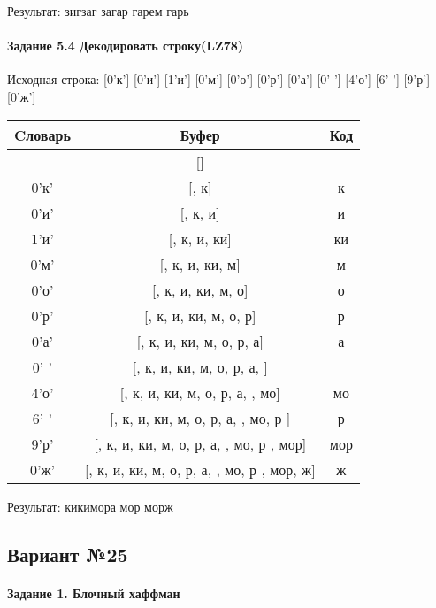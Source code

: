 \documentclass[a4paper, 12pt]{article}
\begin{document}
Результат: зигзаг загар гарем гарь
\pagebreak
\paragraph{Задание 5.4 Декодировать строку(LZ78)\\}

Исходная строка: [0'к'] [0'и'] [1'и'] [0'м'] [0'о'] [0'р'] [0'а'] [0' '] [4'о'] [6' '] [9'р'] [0'ж']\\
\begin{table}[h!]
\centering
\begin{tabular}{|c|c|c|}
\hline
 Cловарь & Буфер & Код  \\ \hline
 & [] & 
\\ \hline
0'к' & [, к] & к
\\ \hline
0'и' & [, к, и] & и
\\ \hline
1'и' & [, к, и, ки] & ки
\\ \hline
0'м' & [, к, и, ки, м] & м
\\ \hline
0'о' & [, к, и, ки, м, о] & о
\\ \hline
0'р' & [, к, и, ки, м, о, р] & р
\\ \hline
0'а' & [, к, и, ки, м, о, р, а] & а
\\ \hline
0' ' & [, к, и, ки, м, о, р, а,  ] &  
\\ \hline
4'о' & [, к, и, ки, м, о, р, а,  , мо] & мо
\\ \hline
6' ' & [, к, и, ки, м, о, р, а,  , мо, р ] & р 
\\ \hline
9'р' & [, к, и, ки, м, о, р, а,  , мо, р , мор] & мор
\\ \hline
0'ж' & [, к, и, ки, м, о, р, а,  , мо, р , мор, ж] & ж
\\ \hline
\end{tabular}
\end{table}

Результат: кикимора мор морж
\pagebreak
\subsection{Вариант №25}
\paragraph{Задание 1. Блочный хаффман \\}
\end{document}
